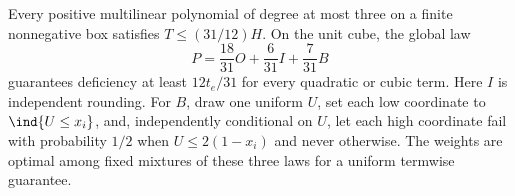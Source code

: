 \begin{theorem}\label{thm:cubic-upper}
Every positive multilinear polynomial of degree at most three on a finite
nonnegative box satisfies $T\le(31/12)H$. On the unit cube, the global
law
\begin{equation}\label{eq:cubic-mixture}
 P=\frac{18}{31}O+\frac6{31}I+\frac7{31}B
\end{equation}
guarantees deficiency at least $12t_e/31$ for every quadratic or cubic
term. Here $I$ is independent rounding. For $B$, draw one uniform $U$,
set each low coordinate to $\ind\{U\le x_i\}$, and, independently
conditional on $U$, let each high coordinate fail with probability $1/2$
when $U\le2(1-x_i)$ and never otherwise. The weights are optimal among
fixed mixtures of these three laws for a uniform termwise guarantee.
\end{theorem}

